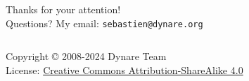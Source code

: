 \documentclass[aspectratio=169]{beamer}
\begin{document}
\begin{frame}
  \begin{center}
    \vfill {\LARGE Thanks for your attention! \\
    Questions?}
    \vfill
    {\LARGE My email: \texttt{sebastien@dynare.org}}
    \vfill
  \end{center}
  \vfill
  \begin{columns}[T]

    \ccbysa
    \tiny
    Copyright © 2008-2024 Dynare Team \\
    License: \href{http://creativecommons.org/licenses/by-sa/4.0/}{Creative
      Commons Attribution-ShareAlike 4.0}
  \end{columns}
\end{frame}
\end{document}

